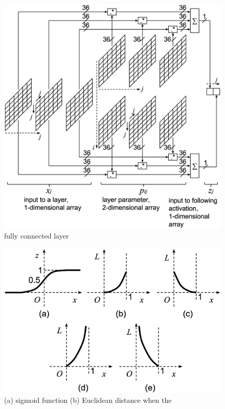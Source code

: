 \documentclass[twocolumn]{article}
\begin{document}
\begin{figure}[!tb]
 \begin{center}
  \begin{minipage}{\hsize}
   \includegraphics[width=\hsize]{fig/layer_fully_connected_02.eps}
   \caption{fully connected layer}
   \label{fig:layer_fully_connected}
  \end{minipage}
 \end{center}
\end{figure}

\begin{figure}[!tb]
 \begin{center}
  \begin{minipage}{\hsize}
   \includegraphics[width=\hsize]{fig/curves_02.eps}
   \caption{(a) sigmoid function
    (b) Euclidean distance when the}
   \label{fig:curves}
  \end{minipage}
 \end{center}
\end{figure}
\end{document}
